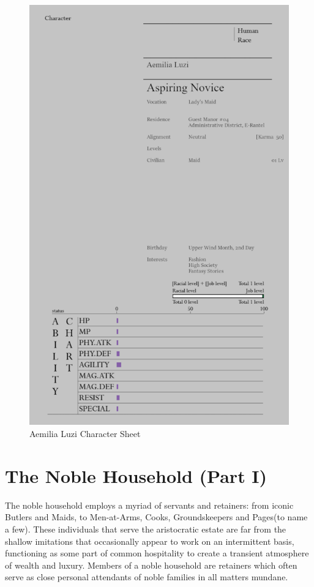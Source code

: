 
\begin{figure}
    \centering
    \includegraphics[width=1\linewidth]{V1 Birthright//images/NaUEKrB.png}
    \caption*{Aemilia Luzi Character Sheet}
\end{figure}

\section*{The Noble Household (Part I)}

The noble household employs a myriad of servants and retainers: from iconic Butlers and Maids, to Men-at-Arms, Cooks, Groundskeepers and Pages(to name a few). These individuals that serve the aristocratic estate are far from the shallow imitations that occasionally appear to work on an intermittent basis, functioning as some part of common hospitality to create a transient atmosphere of wealth and luxury. Members of a noble household are retainers which often serve as close personal attendants of noble families in all matters mundane.

